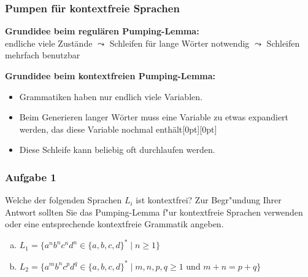 \documentclass{beamer}
\newcommand{\ghost}[1]{\raisebox{0pt}[0pt][0pt]{\makebox[0pt][l]{#1}}}
\begin{document}
	\begin{frame}\frametitle{Pumpen für kontextfreie Sprachen}
		\footnotesize	
		\textbf{Grundidee beim regulären Pumping-Lemma:} \\
		endliche viele Zustände $\leadsto$ Schleifen für lange Wörter notwendig $\leadsto$ Schleifen mehrfach benutzbar
		\pause
		
		\textbf{Grundidee beim kontextfreien Pumping-Lemma:}
		\begin{itemize}
			\item Grammatiken haben nur endlich viele Variablen.
			\item Beim Generieren langer Wörter muss eine Variable zu etwas expandiert werden, das diese Variable nochmal enthält\ghost{:}\\
			\item Diese Schleife kann beliebig oft durchlaufen werden.
		\end{itemize}
	
	\end{frame}
	

	\begin{frame} \frametitle{Aufgabe 1}
		\small
		Welche der folgenden Sprachen $L_i$ ist kontextfrei? Zur Begr"undung
		Ihrer Antwort sollten Sie das Pumping-Lemma f"ur kontextfreie
		Sprachen verwenden oder eine entsprechende kontextfreie Grammatik
		angeben.
		\begin{enumerate}[a)]
			\item $L_1 =\{ a^n b^n c^n d^n \in \{a,b,c,d\}^\ast  \mid n\ge 1 \}$
			\item $L_2 =\{ a^mb^n c^pd^q \in \{a,b,c,d\}^\ast  \mid m,n,p,q \ge 1
			\text{ und } m+n = p + q \}$
		\end{enumerate}
	\end{frame}
\end{document}
